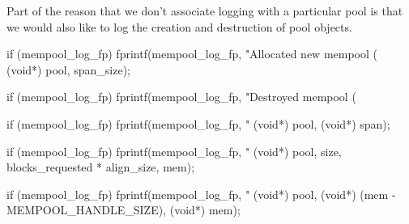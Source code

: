 \nwendcode{}\nwdocspar

Part of the reason that we don't associate logging with a particular
pool is that we would also like to log the creation and destruction
of pool objects.

\nwenddocs{}\endmoddef
if (mempool_log_fp)
    fprintf(mempool_log_fp, "Allocated new mempool (%
            (void*) pool, span_size);
\nwendcode{}\nwdocspar

\nwenddocs{}\endmoddef
if (mempool_log_fp)
    fprintf(mempool_log_fp, "Destroyed mempool (%
\nwendcode{}\nwdocspar

\nwenddocs{}\endmoddef
if (mempool_log_fp)
    fprintf(mempool_log_fp, "%
            (void*) pool, (void*) span);
\nwendcode{}\nwdocspar

\nwenddocs{}\endmoddef
if (mempool_log_fp)
    fprintf(mempool_log_fp,
            "%
            (void*) pool, size, blocks_requested * align_size,
            mem);
\nwendcode{}\nwdocspar

\nwenddocs{}\endmoddef
if (mempool_log_fp)
    fprintf(mempool_log_fp,
            "%
            (void*) pool, (void*) (mem - MEMPOOL_HANDLE_SIZE), (void*) mem);
\nwendcode{}\nwdocspar

